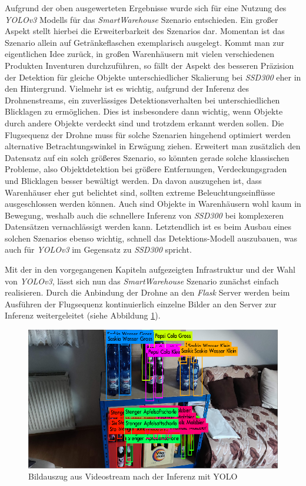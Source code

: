 Aufgrund der oben ausgewerteten Ergebnisse wurde sich für eine Nutzung des \textit{YOLOv3} Modells für das \textit{SmartWarehouse} Szenario entschieden. Ein großer Aspekt stellt hierbei die Erweiterbarkeit des Szenarios dar. Momentan ist das Szenario allein auf Getränkeflaschen exemplarisch ausgelegt. Kommt man zur eigentlichen Idee zurück, in großen Warenhäusern mit vielen verschiedenen Produkten Inventuren durchzuführen, so fällt der Aspekt des besseren Präzision der Detektion für gleiche Objekte unterschiedlicher Skalierung bei \textit{SSD300} eher in den Hintergrund. Vielmehr ist es wichtig, aufgrund der Inferenz des Drohnenstreams, ein zuverlässiges Detektionsverhalten bei unterschiedlichen Blicklagen zu ermöglichen. Dies ist insbesondere dann wichtig, wenn Objekte durch andere Objekte verdeckt sind und trotzdem erkannt werden sollen. Die Flugsequenz der Drohne muss für solche Szenarien hingehend optimiert werden alternative Betrachtungswinkel in Erwägung ziehen. Erweitert man zusätzlich den Datensatz auf ein solch größeres Szenario, so könnten gerade solche klassischen Probleme, also Objektdetektion bei größere Entfernungen, Verdeckungsgraden und Blicklagen besser bewältigt werden. Da davon auszugehen ist, dass Warenhäuser eher gut belichtet sind, sollten extreme Beleuchtungseinflüsse ausgeschlossen werden können. Auch sind Objekte in Warenhäusern wohl kaum in Bewegung, weshalb auch die schnellere Inferenz von \textit{SSD300} bei komplexeren Datensätzen vernachlässigt werden kann. Letztendlich ist es beim Ausbau eines solchen Szenarios ebenso wichtig, schnell das Detektions-Modell auszubauen, was auch für \textit{YOLOv3} im Gegensatz zu \textit{SSD300} spricht. 

Mit der in den vorgegangenen Kapiteln aufgezeigten Infrastruktur und der Wahl von \textit{YOLOv3}, lässt sich nun das \textit{SmartWarehouse} Szenario zunächst einfach realisieren. Durch die Anbindung der Drohne an den \textit{Flask} Server werden beim Ausführen der Flugsequenz kontinuierlich einzelne Bilder an den Server zur Inferenz weitergeleitet (siehe Abbildung \ref{yolo_inference}). 

\begin{figure}[H]
	\begin{center}
		\includegraphics[width=13cm]{Bilder/yolo_inference.png} 
		\caption{Bildauszug aus Videostream nach der Inferenz mit YOLO}
		\label{yolo_inference}
	\end{center}
\end{figure}

